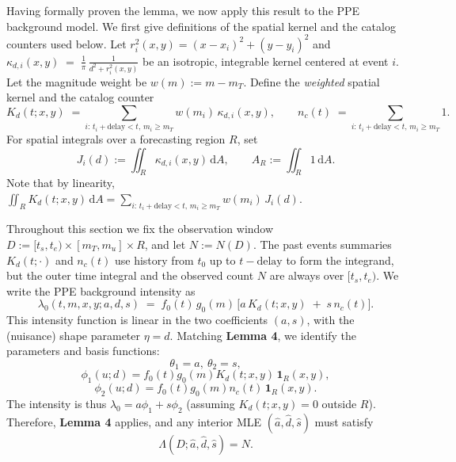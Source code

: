 \documentclass[extra,mreferee]{gji}
\theoremstyle{lemma}
\begin{document}
Having formally proven the lemma, we now apply this result to the PPE background model.
We first give definitions of the spatial kernel and the catalog counters used below.
Let $r_i^2(x,y)=(x-x_i)^2+(y-y_i)^2$ and
$
\kappa_{d,i}(x,y)\;=\;\frac{1}{\pi}\,\frac{1}{d^2+r_i^2(x,y)}
$
be an isotropic, integrable kernel centered at event $i$.
Let the magnitude weight be $w(m):=m-m_T$. Define the \emph{weighted} spatial kernel and the catalog counter
\[
K_d(t;x,y)\;=\!\!\sum_{i:\,t_i+\mathrm{delay}<t,\,m_i\ge m_T}\! w(m_i)\,\kappa_{d,i}(x,y),
\qquad
n_c(t)\;=\!\!\sum_{i:\,t_i+\mathrm{delay}<t,\,m_i\ge m_T}\! 1.
\]
For spatial integrals over a forecasting region $R$, set
\[
J_i(d):=\iint_R \kappa_{d,i}(x,y)\,\mathrm{d}A,
\qquad
A_R:=\iint_R 1\,\mathrm{d}A .
\]
Note that by linearity,
$
\iint_R K_d(t;x,y)\,\mathrm{d}A
=\sum_{i:\,t_i+\mathrm{delay}<t,\,m_i\ge m_T} w(m_i)\,J_i(d).
$

Throughout this section we fix the observation window $D := [t_s,t_e)\times[m_T,m_u]\times R$, and let $N := N(D)$. The past events summaries $K_d(t;\cdot)$ and $n_c(t)$ use history from $t_0$ up to $t-\mathrm{delay}$ to form the integrand, but the outer time integral and the observed count $N$ are always over $[t_s,t_e)$. We write the PPE background intensity as
\[
\lambda_0(t,m,x,y; a,d,s)\;=\; f_0(t)\,g_0(m)\,\Big[a\,K_d(t;x,y)\;+\;s\,n_c(t)\Big].
\]
This intensity function is linear in the two coefficients $(a,s)$, with the (nuisance) shape parameter $\eta=d$.
Matching \textbf{Lemma 4}, we identify the parameters and basis functions:
\[
\theta_1=a,\ \theta_2=s,
\]
\[
\phi_1(u;d)=f_0(t)g_0(m)K_d(t;x,y)\,\mathbf{1}_R(x,y),
\]
\[
\phi_2(u;d)=f_0(t)g_0(m)n_c(t)\,\mathbf{1}_R(x,y).
\]
The intensity is thus $\lambda_0=a\phi_1+s\phi_2$ (assuming $K_d(t;x,y)=0$ outside $R$). Therefore, \textbf{Lemma 4} applies, and any interior MLE $(\hat a,\hat d,\hat s)$ must satisfy
\[
\boxed{\Lambda(D;\hat a,\hat d,\hat s)=N}.
\]


\label{lastpage}
\end{document}
